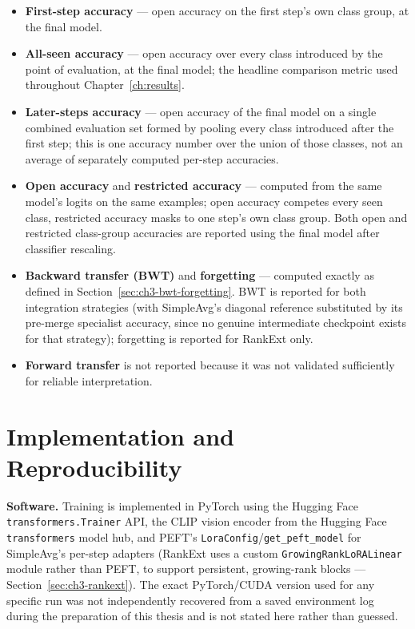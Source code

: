 \begin{itemize}
\item \textbf{First-step accuracy} --- open accuracy on the first step's own
class group, at the final model.
\item \textbf{All-seen accuracy} --- open accuracy over every class
introduced by the point of evaluation, at the final model; the headline
comparison metric used throughout Chapter~\ref{ch:results}.
\item \textbf{Later-steps accuracy} --- open accuracy of the final model on
a single combined evaluation set formed by pooling every class introduced
after the first step; this is one accuracy number over the union of those
classes, not an average of separately computed per-step accuracies.
\end{itemize}

\begin{itemize}
\item \textbf{Open accuracy} and \textbf{restricted accuracy} --- computed
from the same model's logits on the same examples; open accuracy competes
every seen class, restricted accuracy masks to one step's own class group.
Both open and restricted class-group accuracies are reported using the
final model after classifier rescaling.
\item \textbf{Backward transfer (BWT)} and \textbf{forgetting} --- computed
exactly as defined in Section~\ref{sec:ch3-bwt-forgetting}. BWT is reported
for both integration strategies (with SimpleAvg's diagonal reference
substituted by its pre-merge specialist accuracy, since no genuine
intermediate checkpoint exists for that strategy); forgetting is reported
for RankExt only.
\item \textbf{Forward transfer} is not reported because it was not
validated sufficiently for reliable interpretation.
\end{itemize}

\section{Implementation and Reproducibility}
\label{sec:ch4-reproducibility}

\textbf{Software.} Training is implemented in PyTorch using the Hugging Face
\texttt{transformers.Trainer} API, the CLIP vision encoder from the Hugging
Face \texttt{transformers} model hub, and PEFT's
\texttt{LoraConfig}/\texttt{get\_peft\_model} for SimpleAvg's per-step
adapters (RankExt uses a custom \texttt{Growing\allowbreak RankLoRA\allowbreak Linear} module rather
than PEFT, to support persistent, growing-rank blocks ---
Section~\ref{sec:ch3-rankext}). The exact PyTorch/CUDA version used for any
specific run was not independently recovered from a saved environment log
during the preparation of this thesis and is not stated here rather than
guessed.

